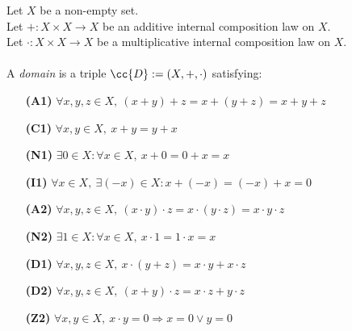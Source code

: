 \begin{definition-pre}[Domain]
    \label{def:domain}
    Let $X$ be a non-empty set. \\
    Let $+: X\times X \to X$ be an additive internal composition law on $X$. \\
    Let $\cdot: X\times X \to X$ be a multiplicative internal composition law on $X$. \\\\
    A \textit{domain} is a triple $\cc{D}:= (X, +, \cdot)$ satisfying:
    \begin{enumerate}
        \item [\textbf{(A1)}] $\forall x,y,z\in X,\ (x+y)+z= x+(y+z) = x+y+z$
        \item [\textbf{(C1)}] $\forall x,y\in X,\ x+y = y+x$
        \item [\textbf{(N1)}] $\exists 0 \in X : \forall x \in X,\ x+0 = 0+x = x$
        \item [\textbf{(I1)}] $\forall x \in X,\ \exists (-x)\in X: x+(-x) = (-x)+x = 0$
        \item [\textbf{(A2)}] $\forall x,y,z\in X,\ (x\cdot y)\cdot z= x\cdot(y\cdot z) = x\cdot y\cdot z$
        \item [\textbf{(N2)}] $\exists 1 \in X : \forall x \in X,\ x\cdot1 = 1\cdot x = x$
        \item [\textbf{(D1)}] $\forall x,y,z \in X,\ x\cdot(y+z)=x\cdot y+x\cdot z$
        \item [\textbf{(D2)}] $\forall x,y,z \in X,\ (x+y)\cdot z=x\cdot z+y\cdot z$
        \item [\textbf{(Z2)}] $\forall x,y \in X,\ x\cdot y = 0 \Rightarrow x=0 \lor y=0$
    \end{enumerate}
\end{definition-pre}

